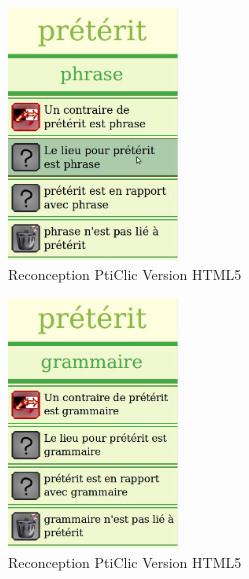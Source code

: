 \documentclass{beamer}
\begin{document}
\begin{frame}  
\begin{figure}[h!]
  \centering
      \includegraphics[width=0.4\textwidth]{img/preterit02.jpg}
\caption{Reconception PtiClic Version HTML5}
\end{figure}
\end{frame}

\begin{frame}  
\begin{figure}[h!]
  \centering
      \includegraphics[width=0.4\textwidth]{img/preterit03.jpg}
\caption{Reconception PtiClic Version HTML5}
\end{figure}
\end{frame}
\end{document}
